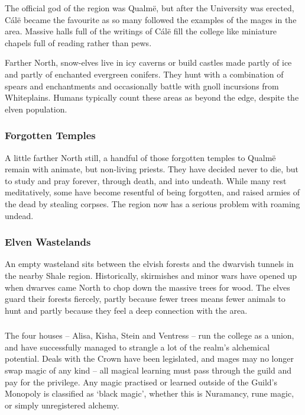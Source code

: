 \begin{multicols}{2}
The official god of the region was Qualm\"{e}, but after the University was erected, C\'{a}l\"{e} became the favourite as so many followed the examples of the mages in the area.
Massive halls full of the writings of C\'{a}l\"{e} fill the college like miniature chapels full of reading rather than pews.

Farther North, snow-elves live in icy caverns or build castles made partly of ice and partly of enchanted evergreen conifers.
They hunt with a combination of spears and enchantments and occasionally battle with gnoll incursions from Whiteplains.
Humans typically count these areas as beyond the \gls{edge}, despite the elven population.

\subsubsection{Forgotten Temples}

A little farther North still, a handful of those forgotten temples to Qualm\"{e} remain with animate, but non-living priests.
They have decided never to die, but to study and pray forever, through death, and into undeath.
While many rest meditatively, some have become resentful of being forgotten, and raised armies of the dead by stealing corpses.
The region now has a serious problem with roaming undead.

\subsubsection{Elven Wastelands}

An empty wasteland sits between the elvish forests and the dwarvish tunnels in the nearby Shale region.
Historically, skirmishes and minor wars have opened up when dwarves came North to chop down the massive trees for wood.
The elves guard their forests fiercely, partly because fewer trees means fewer animals to hunt and partly because they feel a deep connection with the area.

\subsubsection{}

The four houses -- Alisa, Kisha, Stein and Ventress -- run the college as a union, and have successfully managed to strangle a lot of the realm's alchemical potential.
Deals with the Crown have been legislated, and mages may no longer swap magic of any kind -- all magical learning must pass through the guild and pay for the privilege.
Any magic practised or learned outside of the Guild's Monopoly is classified as `black magic', whether this is Nuramancy, rune magic, or simply unregistered alchemy.


\end{multicols}
